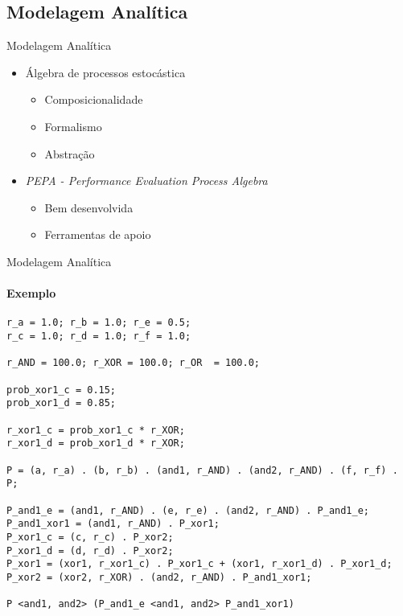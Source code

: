 \documentclass[xcolor=x11names,compress]{beamer}
\renewcommand{\(}{\begin{columns}}
\renewcommand{\)}{\end{columns}}
\newcommand{\<}[1]{\begin{column}{#1}}
\renewcommand{\>}{\end{column}}
\begin{document}
    \subsection{Modelagem Analítica}
        \begin{frame}{Modelagem Analítica}
            \begin{itemize}
                \item<1-> Álgebra de processos estocástica
                    \begin{itemize}
                        \item<2-> Composicionalidade
                        \item<2-> Formalismo
                        \item<2-> Abstração
                    \end{itemize}
                \item<3-> \emph{PEPA - Performance Evaluation Process Algebra}
                    \begin{itemize}
                        \item<4-> Bem desenvolvida
                        \item<4-> Ferramentas de apoio
                    \end{itemize}
            \end{itemize}
        \end{frame}

\begin{frame}[fragile]{Modelagem Analítica}
    \framesubtitle{Exemplo}
    \begin{lstlisting}[basicstyle=\tiny]
r_a = 1.0; r_b = 1.0; r_e = 0.5;
r_c = 1.0; r_d = 1.0; r_f = 1.0;

r_AND = 100.0; r_XOR = 100.0; r_OR  = 100.0;

prob_xor1_c = 0.15;
prob_xor1_d = 0.85;

r_xor1_c = prob_xor1_c * r_XOR;
r_xor1_d = prob_xor1_d * r_XOR;

P = (a, r_a) . (b, r_b) . (and1, r_AND) . (and2, r_AND) . (f, r_f) . P;

P_and1_e = (and1, r_AND) . (e, r_e) . (and2, r_AND) . P_and1_e;
P_and1_xor1 = (and1, r_AND) . P_xor1;
P_xor1_c = (c, r_c) . P_xor2;
P_xor1_d = (d, r_d) . P_xor2;
P_xor1 = (xor1, r_xor1_c) . P_xor1_c + (xor1, r_xor1_d) . P_xor1_d;
P_xor2 = (xor2, r_XOR) . (and2, r_AND) . P_and1_xor1;

P <and1, and2> (P_and1_e <and1, and2> P_and1_xor1)
    \end{lstlisting}
\end{frame}
\end{document}
